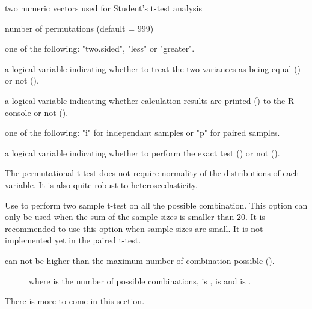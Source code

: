 \documentclass[a4paper]{book}
\begin{document}
\begin{Arguments}
\begin{ldescription}
\item[\code{vec1, vec2 }] 
two numeric vectors used for Student's t-test analysis

\item[\code{nperm }] 
number of permutations (default = 999)

\item[\code{alternative }] 
one of the following: "two.sided", "less" or "greater".

\item[\code{var.equal }] 
a logical variable indicating whether to treat the two variances as being equal () or not ().

\item[\code{silent }] 
a logical variable indicating whether calculation results are printed () to the R console or not ().

\item[\code{type }] 
one of the following: "i" for independant samples or "p" for paired samples.

\item[\code{exact }] 
a logical variable indicating whether to perform the exact test () or not ().

\end{ldescription}
\end{Arguments}
%
\begin{Details}\relax
The permutational t-test does not require normality of the distributions of each variable.
It is also quite robust to heteroscedasticity.

Use  to perform two sample t-test on all the possible combination.
This option can only be used when the sum of the sample sizes  is smaller than 20.
It is recommended to use this option when sample sizes are small.
It is not implemented yet in the paired t-test.

 can not be higher than the maximum number of combination possible ().

\begin{description}

\item[] 


where  is the number of possible combinations, 
is ,  is
 and  is
.
\end{description}


There is more to come in this section.

\end{Details}
\end{document}
